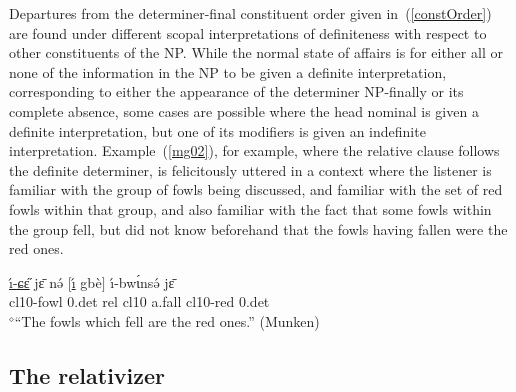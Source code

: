 \documentclass[10pt,twoside]{article}
\makeatletter
\newcommand{\cl}[1]{{\sc cl#1}}
\def\elicited{$^\diamond$}
\renewcommand{\i}{ı}
\def\@{ə}
\def\eh{ɛ}
\def\ih{ɩ}
\def\sh{ɕ}
\makeatother
\begin{document}
Departures from the determiner-final
constituent order given in~(\ref{constOrder})
are found
under different scopal interpretations of definiteness
with respect to other constituents of the NP. While the normal state
of affairs is for either all or none of the information in the NP to
be given a definite interpretation, corresponding to 
either the appearance of the determiner NP-finally or its complete absence,
some cases are possible where the
head nominal is given a definite interpretation, but one of its modifiers
is given an indefinite interpretation.
Example~(\ref{mg02}), for example, where the relative clause follows
the definite determiner, is felicitously uttered in a context where
the listener is familiar with the group of fowls being discussed, 
and familiar with the set of red fowls within that group, and also
familiar with the fact that some fowls within the group fell, 
but did not know beforehand that the fowls having fallen were the red
ones.
%
\begin{exe}
\ex \gll \uline{\'\i-\sh\H{\eh}} j\={\eh} n\'{\@} $[$\uline{\'{\i}} gb\`e$]$ \'\i-bw\'{\ih}ns\'{\@} j\={\eh}	\\
\cl10-fowl {\sc \cl10.det} {\sc rel} \cl10 a.fall \cl10-red {\sc \cl10.det}	\\
\glt \elicited``The fowls which fell are the red ones.'' (Munken)	\label{mg02}
\end{exe}
%

\subsection{The relativizer}\label{secMungbamRelativizer}
%
\end{document}
